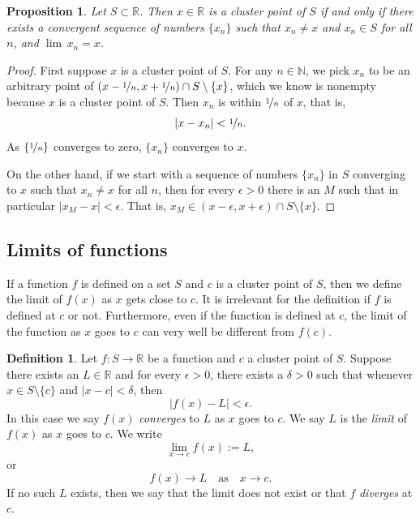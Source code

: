 \documentclass[12pt]{book}
\newcommand{\abs}[1]{\left\lvert {#1} \right\rvert}
\newcommand{\R}{{\mathbb{R}}}
\newcommand{\N}{{\mathbb{N}}}
\newcommand{\myindex}[1]{#1\index{#1}}
\theoremstyle{plain}
\newtheorem{prop}[thm]{Proposition}
\theoremstyle{remark}
\theoremstyle{definition}
\newtheorem{defn}[thm]{Definition}
\theoremstyle{exercise}
\theoremstyle{example}
\begin{document}
\begin{prop}
Let $S \subset \R$.  Then $x \in \R$ is a cluster point of $S$
if and only if
there exists a convergent sequence of numbers $\{ x_n \}$ such that
$x_n \not= x$ and $x_n \in S$ for all $n$, and $\lim\, x_n = x$.
\end{prop}

\begin{proof}
First suppose $x$ is a cluster point of $S$.
For any $n \in \N$, we pick $x_n$ to be an arbitrary point of
$(x-\nicefrac{1}{n},x+\nicefrac{1}{n}) \cap S \setminus \{x\}$, which
we know is nonempty because $x$ is a cluster point of $S$.
Then
$x_n$ is within $\nicefrac{1}{n}$ of $x$, that is,
\begin{equation*}
\abs{x-x_n} < \nicefrac{1}{n} .
\end{equation*}
As $\{ \nicefrac{1}{n} \}$ converges to zero, $\{ x_n \}$ converges to $x$.

On the other hand, if we start with a sequence of numbers $\{ x_n \}$ in $S$
converging to $x$ such that $x_n \not= x$ for all $n$, then for every
$\epsilon > 0$ there is an $M$ such that in particular $\abs{x_M - x} <
\epsilon$.  That is, $x_M \in (x-\epsilon,x+\epsilon) \cap S \setminus \{x\}$.
\end{proof}

\subsection{Limits of functions}

If a function $f$ is defined on a set $S$ and $c$ is a cluster point of $S$,
then we define the limit of $f(x)$ as $x$ gets close to $c$.  
It is irrelevant for the definition if $f$ is defined at $c$ or not.
Furthermore, even if the function is defined at $c$, the limit of the
function as $x$ goes to $c$ can very well be different
from $f(c)$.

\begin{defn}
%
Let $f \colon S \to \R$ be a function and $c$ a cluster point of $S$.
Suppose there exists an $L \in \R$ and for every $\epsilon > 0$,
there exists a $\delta > 0$ such that whenever $x \in S \setminus \{ c \}$
and $\abs{x - c} < \delta$, then
\begin{equation*}
\abs{f(x) - L} < \epsilon .
\end{equation*}
In this case we say $f(x)$ \emph{\myindex{converges}} to $L$ as $x$ goes
to $c$.  We say $L$ is the \emph{\myindex{limit}} of $f(x)$ as $x$
goes to $c$.  We write
\begin{equation*}
\lim_{x \to c} f(x) := L ,
\end{equation*}
or 
\begin{equation*}
f(x) \to L \quad\text{as}\quad x \to c .
\end{equation*}
If no such $L$ exists, then we say that the limit does not exist or
that $f$ \emph{\myindex{diverges}} at $c$.
\end{defn}
\end{document}
